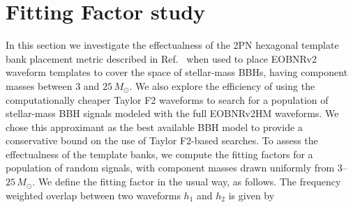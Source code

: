 \documentclass[aps,
prd,
amsmath,
amssymb,
twocolumn,
floatfix,
groupedaddress]{revtex4-1}
\begin{document}
\section{Fitting Factor study}\label{sec:level1:FFStudy}
In this section we investigate the effectualness of the 2PN hexagonal template bank placement metric described in Ref.~\citep{BabaketalBankPlacement} when used to place EOBNRv2 waveform templates to cover the space of stellar-mass BBHs, having component masses between $3$ and $25\, M_{\odot}$. We also explore the efficiency of using the computationally cheaper Taylor F2 waveforms to search for a population of stellar-mass BBH signals modeled with the full EOBNRv2HM waveforms. We chose this approximant as the best available BBH model to provide a conservative bound on the use of Taylor F2-based searches. To assess the effectualness of the template banks, we compute the fitting factors \citep{FittingFactorApostolatos} for a population of random signals, with component masses drawn uniformly from $3$--$25\, M_\odot$. We define the fitting factor in the usual way, as follows. The frequency weighted overlap between two waveforms $h_1$ and $h_2$ is given by
\end{document}
